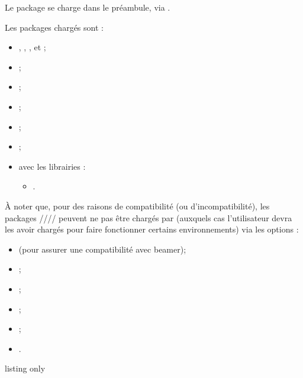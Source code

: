 \documentclass[french,11pt,a4paper]{article}
\begin{document}
Le package se charge dans le préambule, via .

Les packages chargés sont :

\begin{itemize}
	\item {}, , ,  et  ;
	\item {} ;
	\item {} ;
	\item {} ;
	\item {} ;
	\item {} ;
	\item {} avec les librairies :
	\begin{itemize}
		\item {}.
	\end{itemize}
\end{itemize}

À noter que, pour des raisons de compatibilité (ou d'incompatibilité), les packages //// peuvent ne pas être chargés par  (auxquels cas l'utilisateur devra les avoir chargés pour faire fonctionner certains environnements) via les options :

\begin{itemize}
	\item {} (pour assurer une compatibilité avec \textsf{beamer});
	\item {} ;
	\item {} ;
	\item {} ;
	\item {} ;
	\item {}.
\end{itemize}

\begin{DemoCode}{listing only}
\usepackage{customenvs}

\usepackage[option(s)]{customenvs}
\end{DemoCode}
\end{document}
